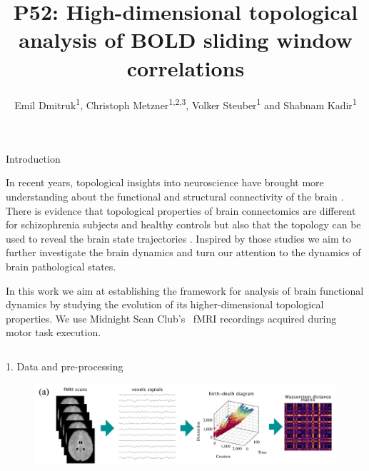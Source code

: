 \documentclass[final]{beamer}
\title[UH poster]{P52: High-dimensional topological analysis of BOLD sliding window correlations}
\author[Dmitruk]{Emil Dmitruk\textsuperscript{1}, Christoph Metzner\textsuperscript{1,2,3}, Volker Steuber\textsuperscript{1} and Shabnam Kadir\textsuperscript{1}
}
\institute[UH]{\textsuperscript{1}University of Hertfordshire, UK; \textsuperscript{2}Technische Universität Berlin, Germany;\textsuperscript{3}Charité-Universitätsmedizin Berlin, Germany}
\begin{document}
\begin{frame}{} 
  \begin{block}{Introduction}
  \small{
      In recent years, topological insights into neuroscience have brought more understanding about the functional and structural connectivity of the brain \cite{Saggar2018a}\cite{Sizemore2018}. There is evidence that topological properties of brain connectomics are different for schizophrenia subjects and healthy controls \cite{Stolz2018} \cite{Dmitruk2021} but also that the topology can be used to reveal the brain state trajectories \cite{Rieck2020a}. Inspired by those studies we aim to further investigate the brain dynamics and turn our attention to the dynamics of brain pathological states.
      
      
    In this work we aim at establishing the framework for analysis of brain functional dynamics by studying the evolution of its higher-dimensional topological properties.
    We use Midnight Scan Club's~\cite{Gordon2017} fMRI recordings acquired during motor task execution.
    }
  \end{block}
\begin{columns}
    \begin{column}{0.65\textwidth}
        \begin{block}{1. Data and pre-processing}
            \begin{figure}[H]
                \centering
                \includegraphics[width=\linewidth]{images/1-preproc.png}
                \label{fig:preproc}
            \end{figure}
\end{block}
\end{column}
\end{columns}
\end{frame}
\end{document}
